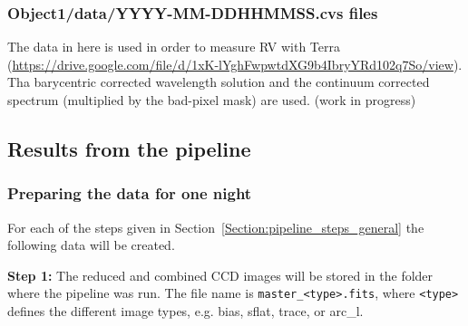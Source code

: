 \documentclass[10pt,a4paper]{article}
\begin{document}
\subsubsection{Object1/data/YYYY-MM-DDHHMMSS.cvs files}
The data in here is used in order to measure RV with Terra (\url{https://drive.google.com/file/d/1xK-lYghFwpwtdXG9b4IbryYRd102q7So/view}). Tha barycentric corrected wavelength solution and the continuum corrected spectrum (multiplied by the bad-pixel mask) are used. 
(work in progress)

\subsection{Results from the pipeline}
\subsubsection{Preparing the data for one night}
\label{section:results_pipeline}
For each of the steps given in Section~\ref{Section:pipeline_steps_general} the following data will be created.

\noindent \textbf{Step 1:} The reduced and combined CCD images will be stored in the folder where the pipeline was run. The file name is \verb|master_<type>.fits|, where \verb|<type>| defines the different image types, e.g. bias, sflat, trace, or arc\_l.
\end{document}
